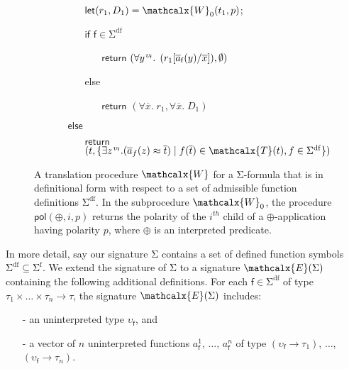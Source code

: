 \documentclass[runningheads,a4paper]{llncs}
\newcommand{\con}[1]{\mathsf{#1}}
\renewcommand\vec[1]{\overline{#1}}
\let\oldSigma=\Sigma
\def\Sigma{\mathrm{\oldSigma}}
\newcommand{\teq}{\approx}
\newcommand{\terms}{\mathcalx{T}}
\newcommand{\conv}{\mathcalx{W}}
\newcommand{\sfuns}[1]{#1^\mathrm{f}}
\newcommand{\sfundefs}[1]{#1^\mathrm{df}}
\newcommand{\pol}{\con{pol}}
\newcommand{\boolop}{\oplus}
\newcommand{\farg}[1]{a_{#1}}
\newcommand{\vecfarg}[1]{\vec{a}_{#1}}
\newcommand{\fargsort}[1]{\upsilon_{#1}}
\newcommand{\extendsig}[1]{\mathcalx{E}( #1 )}
\newcommand{\vthinspace}{\kern+0.083333em}
\newcommand{\typ}[1]{^{\vthinspace #1}}
\begin{document}
\begin{figure}[t]
\begin{enumerate}
\begin{itemize}
\begin{itemize}
      \item[] $\mathsf{let} ( r_1, D_1 ) = \conv_0( t_1, p )$;
      \item[] $\mathsf{if}$ $\con{f} \in \sfundefs{\Sigma}$
      \begin{itemize}
        \item[] $\mathsf{return}$ $( \forall y\typ{\fargsort{\con{f}}}.\;\, ( r_1 [ \vecfarg{\con{f}}( y ) / \vec x ] ), \emptyset )$
      \end{itemize}
      \item[] else
      \begin{itemize}
        \item[] $\mathsf{return}$ $( \forall \vec x.\; r_1, \forall \vec x.\; D_1 )$
      \end{itemize}
    \end{itemize}
   \item[] $\mathsf{else}$
   \begin{itemize}
     \item[] $\mathsf{return}$ $( t, \{ \exists z\typ{\fargsort{\con{f}}}. ( \vecfarg{f}( z ) \teq \vec t ) \mid f( \vec t ) \in \terms( t ), f \in \sfundefs{\Sigma} \} )$
   \end{itemize}
 \end{itemize}
\end{enumerate}
\vspace{-2ex}
\caption{A translation procedure $\conv$ for a $\Sigma$-formula that is in definitional form with respect to a set of admissible function definitions $\sfundefs{\Sigma}$.
In the subprocedure $\conv_0$, the procedure $\pol( \boolop, i, p )$ returns the polarity of the $i^{th}$ child of a $\boolop$-application having polarity $p$,
where $\boolop$ is an interpreted predicate.
}
\label{fig:encoding}
\end{figure}

In more detail, 
say our signature $\Sigma$ contains a set of defined function symbols $\sfundefs{\Sigma} \subseteq \sfuns{\Sigma}$.
We extend the signature of $\Sigma$ to a signature $\extendsig{\Sigma}$ containing the following additional definitions.
For each $\con{f} \in \sfundefs{\Sigma}$ of type $\tau_1 \times \ldots \times \tau_n \rightarrow \tau$, 
the signature $\extendsig{\Sigma}$ includes:
\begin{enumerate}
\item[-] an uninterpreted type $\fargsort{\con{f}}$, and
\item[-] a vector of $n$ uninterpreted functions $\farg{\con{f}}^1$, $\ldots$, $\farg{\con{f}}^n$ of type $(\fargsort{\con{f}} \rightarrow \tau_1)$, $\ldots$, $(\fargsort{\con{f}} \rightarrow \tau_n)$.
\end{enumerate}
\end{document}
